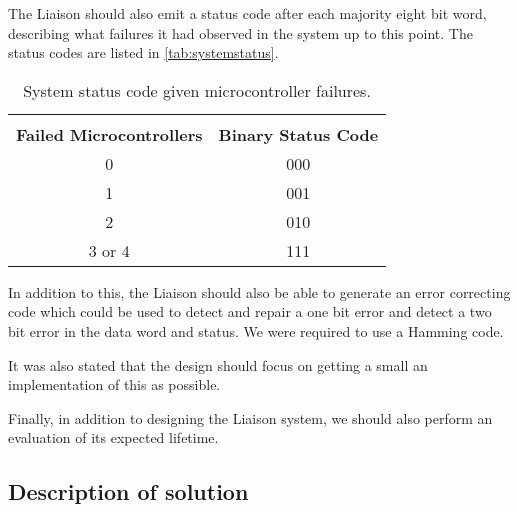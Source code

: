 The Liaison should also emit a status code after each majority eight
bit word, describing what failures it had observed in the system up to
this point. The status codes are listed in \autoref{tab:systemstatus}.

\begin{table}[htbp]
  \centering
  \begin{tabular}{|c|c|}
    \hline \\
    \textbf{Failed Microcontrollers} & \textbf{Binary Status Code} \\ \hline
    0 & 000 \\ \hline
    1 & 001 \\ \hline
    2 & 010 \\ \hline
    3 or 4 & 111 \\ \hline
  \end{tabular}
  \caption{System status code given microcontroller failures.}
  \label{tab:systemstatus}
\end{table}

In addition to this, the Liaison should also be able to generate an
error correcting code which could be used to detect and repair a one
bit error and detect a two bit error in the data word and status. We
were required to use a Hamming code.

It was also stated that the design should focus on getting a small an
implementation of this as possible.

Finally, in addition to designing the Liaison system, we should also
perform an evaluation of its expected lifetime.

\subsection{Description of solution}
